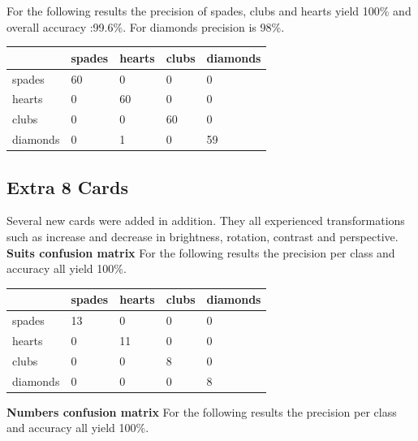 \documentclass[11pt]{article}
\theoremstyle{plain}
\theoremstyle{definition}
\begin{document}
\newline
For the following results the precision of spades, clubs and hearts yield 100\% and overall accuracy :99.6\%. For diamonds precision is 98\%. 
 \begin{center}
    \begin{tabular}{| l | l |  l | l | p{2cm} |}
    \hline
      & spades & hearts & clubs &diamonds \\ \hline
 	   spades & 60 & 0 & 0 &0\\ \hline
 	   hearts & 0 & 60 & 0 &0\\ \hline
 	   clubs & 0 & 0 & 60 &0\\ \hline
 	   diamonds & 0 & 1 & 0&59\\ \hline
    \end{tabular}
 \end{center}
\subsection{Extra 8 Cards}
Several new cards were added in addition. They all experienced transformations such as increase and decrease in brightness, rotation, contrast and perspective.
\newline
\newline
{\bf Suits confusion matrix}
\newline
For the following results the precision per class and accuracy all yield 100\%.
 \begin{center}
    \begin{tabular}{| l | l |  l | l | p{2cm} |}
    \hline
      & spades & hearts & clubs &diamonds \\ \hline
 	   spades & 13 & 0 & 0 &0\\ \hline
 	   hearts & 0 & 11 & 0 &0\\ \hline
 	   clubs & 0 & 0 & 8 &0\\ \hline
 	   diamonds & 0 & 0 & 0&8\\ \hline
    \end{tabular}
 \end{center}
{\bf Numbers confusion matrix}
\newline
For the following results the precision per class and accuracy all yield 100\%.
\end{document}
